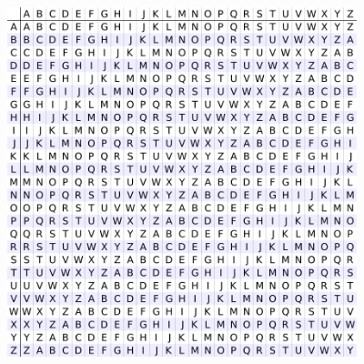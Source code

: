 \documentclass[11pt]{article}
\begin{document}
\includegraphics[width=5in,height=4in]{abc.jpg}
\end{document}
